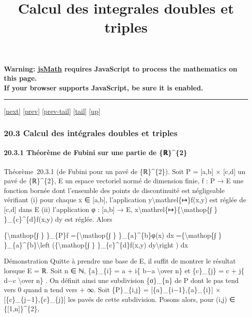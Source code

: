 \documentclass[]{article}
\title{Calcul des integrales doubles et triples}
\author{}
\date{}
\begin{document}
\maketitle

\textbf{Warning: \href{http://www.math.union.edu/locate/jsMath}{jsMath}
requires JavaScript to process the mathematics on this page.\\ If your
browser supports JavaScript, be sure it is enabled.}

\begin{center}\rule{3in}{0.4pt}\end{center}

{[}\href{coursse107.html}{next}{]} {[}\href{coursse105.html}{prev}{]}
{[}\href{coursse105.html\#tailcoursse105.html}{prev-tail}{]}
{[}\hyperref[tailcoursse106.html]{tail}{]}
{[}\href{coursch21.html\#coursse106.html}{up}{]}

\subsubsection{20.3 Calcul des intégrales doubles et triples}

\paragraph{20.3.1 Théorème de Fubini sur une partie de \{ℝ\}\^{}\{2\}}

Théorème~20.3.1 (de Fubini pour un pavé de \{ℝ\}\^{}\{2\}). Soit P =
{[}a,b{]} × {[}c,d{]} un pavé de \{ℝ\}\^{}\{2\}, E un espace vectoriel
normé de dimension finie, f : P → E une fonction bornée dont l'ensemble
des points de discontinuité est négligeable vérifiant (i) pour chaque x
∈ {[}a,b{]}, l'application y\textbackslash{}mathrel\{↦\}f(x,y) est
réglée de {[}c,d{]} dans E (ii) l'application φ : {[}a,b{]} → E,
x\textbackslash{}mathrel\{↦\}\{\textbackslash{}mathop\{∫ \}
\}\_\{c\}\^{}\{d\}f(x,y) dy est réglée. Alors

\{\textbackslash{}mathop\{∫ \} \}\_\{P\}f =\{\textbackslash{}mathop\{∫
\} \}\_\{a\}\^{}\{b\}φ(x) dx =\{\textbackslash{}mathop\{∫ \}
\}\_\{a\}\^{}\{b\}\textbackslash{}left (\{\textbackslash{}mathop\{∫ \}
\}\_\{c\}\^{}\{d\}f(x,y) dy\textbackslash{}right ) dx

Démonstration Quitte à prendre une base de E, il suffit de montrer le
résultat lorsque E = ℝ. Soit n ∈ ℕ, \{a\}\_\{i\} = a + i\{ b−a
\textbackslash{}over n\} et \{c\}\_\{j\} = c + j\{ d−c
\textbackslash{}over n\} . On définit ainsi une subdivision \{σ\}\_\{n\}
de P dont le pas tend vers 0 quand n tend vers + ∞. Soit \{P\}\_\{i,j\}
= {[}\{a\}\_\{i−1\},\{a\}\_\{i\}{]} × {[}\{c\}\_\{j−1\},\{c\}\_\{j\}{]}
les pavés de cette subdivision. Posons alors, pour (i,j) ∈
\{{[}1,n{]}\}\^{}\{2\},
\end{document}
